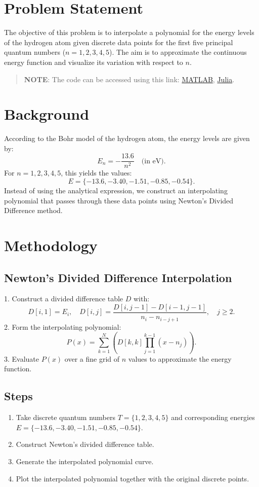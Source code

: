 \section*{Problem Statement}
The objective of this problem is to interpolate a polynomial for the energy levels of the hydrogen atom given discrete data points for the first five principal quantum numbers ($n=1,2,3,4,5$). The aim is to approximate the continuous energy function and visualize its variation with respect to $n$.

\begin{quote}
  \textbf{NOTE}: The code can be accessed using this link: \href{https://raw.githubusercontent.com/HavokSahil/computational-techniques-assignments/refs/heads/main/assignment4/a2.m}{MATLAB}, \href{https://raw.githubusercontent.com/HavokSahil/computational-techniques-assignments/refs/heads/main/assignment4/a2.jl}{Julia}.
\end{quote}


\section*{Background}
According to the Bohr model of the hydrogen atom, the energy levels are given by:
\[
E_n = -\frac{13.6}{n^2} \quad \text{(in eV)}.
\]
For $n=1,2,3,4,5$, this yields the values:
\[
E = \{-13.6, -3.40, -1.51, -0.85, -0.54\}.
\]
Instead of using the analytical expression, we construct an interpolating polynomial that passes through these data points using Newton’s Divided Difference method.

\section*{Methodology}
\subsection*{Newton’s Divided Difference Interpolation}
1. Construct a divided difference table $D$ with:
\[
D[i,1] = E_i, \quad D[i,j] = \frac{D[i,j-1] - D[i-1,j-1]}{n_i - n_{i-j+1}}, \quad j \geq 2.
\]
2. Form the interpolating polynomial:
\[
P(x) = \sum_{k=1}^N \left( D[k,k] \prod_{j=1}^{k-1}(x - n_j) \right).
\]
3. Evaluate $P(x)$ over a fine grid of $n$ values to approximate the energy function.

\subsection*{Steps}
\begin{enumerate}
  \item Take discrete quantum numbers $T = \{1,2,3,4,5\}$ and corresponding energies $E = \{-13.6, -3.40, -1.51, -0.85, -0.54\}$.
  \item Construct Newton’s divided difference table.
  \item Generate the interpolated polynomial curve.
  \item Plot the interpolated polynomial together with the original discrete points.
\end{enumerate}

